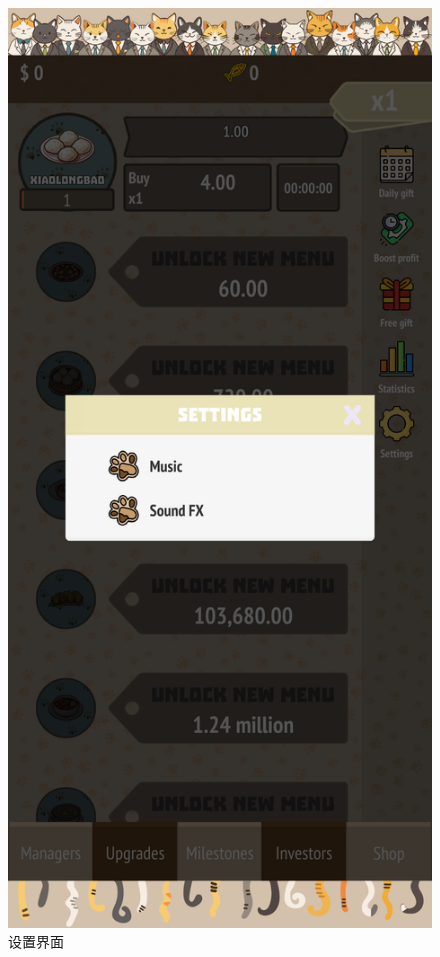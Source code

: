 \documentclass{mancls}%
\begin{document}
\begin{figure}[h]
  \centering
  \includegraphics[height=0.6\textheight]{screenshots/PurrfectEats_009.png}
  \caption{设置界面}
\end{figure}
\end{document}
